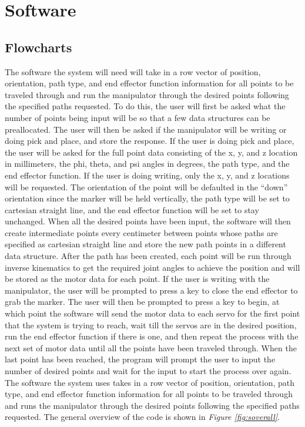 \section{Software}
\subsection*{Flowcharts}
The software the system will need will take in a row vector of position, orientation, path type, and end effector function information for all points to be traveled through and run the manipulator through the desired points following the specified paths requested. To do this, the user will first be asked what the number of points being input will be so that a few data structures can be preallocated. The user will then be asked if the manipulator will be writing or doing pick and place, and store the response. If the user is doing pick and place, the user will be asked for the full point data consisting of the x, y, and z location in millimeters, the phi, theta, and psi angles in degrees, the path type, and the end effector function. If the user is doing writing, only the x, y, and z locations will be requested. The orientation of the point will be defaulted in the “down” orientation since the marker will be held vertically, the path type will be set to cartesian straight line, and the end effector function will be set to stay unchanged. When all the desired points have been input, the software will then create intermediate points every centimeter between points whose paths are specified as cartesian straight line and store the new path points in a different data structure. After the path has been created, each point will be run through inverse kinematics to get the required joint angles to achieve the position and will be stored as the motor data for each point. If the user is writing with the manipulator, the user will be prompted to press a key to close the end effector to grab the marker. The user will then be prompted to press a key to begin, at which point the software will send the motor data to each servo for the first point that the system is trying to reach, wait till the servos are in the desired position, run the end effector function if there is one, and then repeat the process with the next set of motor data until all the points have been traveled through. When the last point has been reached, the program will prompt the user to input the number of desired points and wait for the input to start the process over again.
\captionsetup[sub]{
    labelformat=r-parens}
The software the system uses takes in a row vector of position, orientation, path type, and end effector function information for all points to be traveled through and runs the manipulator through the desired points following the specified paths requested. The general overview of the code is shown in \emph{Figure \ref{fig:soverall}}.

